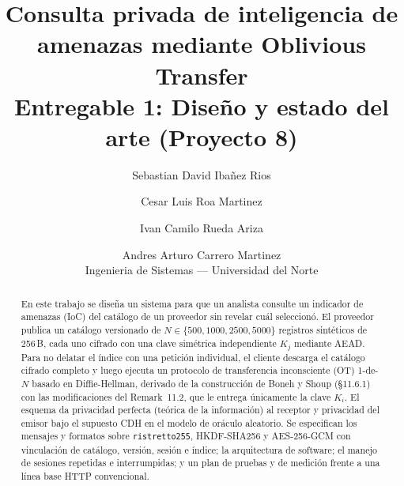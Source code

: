 \documentclass[11pt,a4paper]{article}
\title{Consulta privada de inteligencia de amenazas mediante Oblivious Transfer\\ \large Entregable 1: Dise\~no y estado del arte (Proyecto 8)}
\author{Sebastian David Iba\~nez Rios \and Cesar Luis Roa Martinez \and Ivan Camilo Rueda Ariza \and Andres Arturo Carrero Martinez \\ \small Ingenieria de Sistemas --- Universidad del Norte}
\date{}
\newcommand{\code}[1]{\texttt{#1}}
\begin{document}
\maketitle
\begin{abstract}
En este trabajo se dise\~na un sistema para que un analista consulte un indicador de amenazas (IoC) del cat\'alogo de un proveedor sin revelar cu\'al seleccion\'o. El proveedor publica un cat\'alogo versionado de $N \in \{500, 1000, 2500, 5000\}$ registros sint\'eticos de 256\,B, cada uno cifrado con una clave sim\'etrica independiente $K_j$ mediante AEAD. Para no delatar el \'indice con una petici\'on individual, el cliente descarga el cat\'alogo cifrado completo y luego ejecuta un protocolo de transferencia inconsciente (OT) 1-de-$N$ basado en Diffie-Hellman, derivado de la construcci\'on de Boneh y Shoup (\S11.6.1) con las modificaciones del Remark~11.2, que le entrega \'unicamente la clave $K_i$. El esquema da privacidad perfecta (te\'orica de la informaci\'on) al receptor y privacidad del emisor bajo el supuesto CDH en el modelo de or\'aculo aleatorio. Se especifican los mensajes y formatos sobre \code{ristretto255}, HKDF-SHA256 y AES-256-GCM con vinculaci\'on de cat\'alogo, versi\'on, sesi\'on e \'indice; la arquitectura de software; el manejo de sesiones repetidas e interrumpidas; y un plan de pruebas y de medici\'on frente a una l\'inea base HTTP convencional.
\end{abstract}

\vspace{0.5em}












\end{document}
